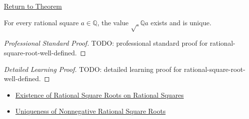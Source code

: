 \newpage
{}
\label{prf:rational-square-root-well-defined}

\begin{remark*}[Return]
\hyperref[thm:rational-square-root-well-defined]{Return to Theorem}
\end{remark*}

\begin{theorem*}
For every rational square $a\in\mathbb{Q}$, the value
$\sqrt_{\mathbb{Q}}{a}$ exists and is unique.
\end{theorem*}

\begin{proof}[Professional Standard Proof]
\LRAProofBodyStart
TODO: professional standard proof for rational-square-root-well-defined.
\end{proof}

\begin{proof}[Detailed Learning Proof]
\LRAProofBodyStart
TODO: detailed learning proof for rational-square-root-well-defined.
\end{proof}

\begin{remark*}
\end{remark*}

\begin{dependencies}
\begin{itemize}
  \item \hyperref[thm:rational-square-root-exists-on-rational-squares]{Existence of Rational Square Roots on Rational Squares}
  \item \hyperref[thm:uniqueness-of-nonnegative-rational-square-roots]{Uniqueness of Nonnegative Rational Square Roots}
\end{itemize}
\end{dependencies}

\clearpage
